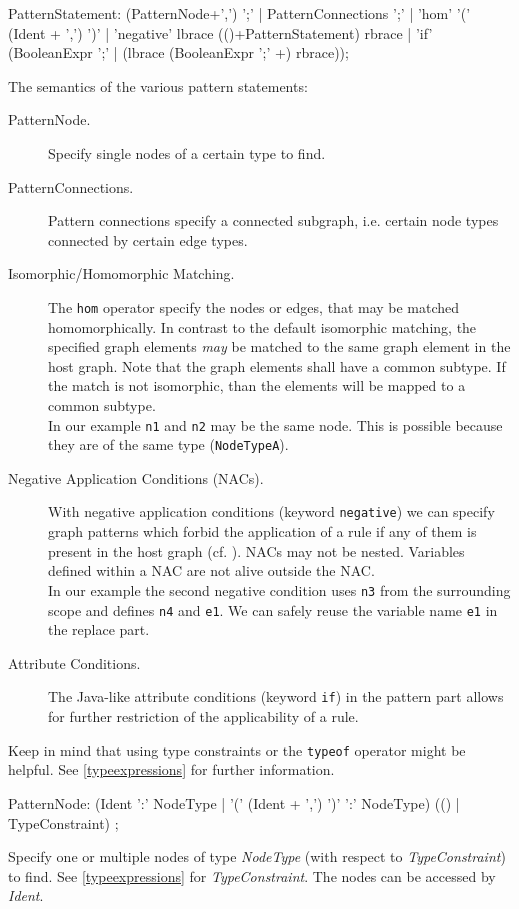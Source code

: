 \begin{rail}  
  PatternStatement: (PatternNode+',') ';' |
    PatternConnections ';' |
    'hom' '(' (Ident + ',') ')' |
    'negative' lbrace (()+PatternStatement) rbrace |
    'if' (BooleanExpr ';' | (lbrace (BooleanExpr ';' +) rbrace));
\end{rail}
The semantics of the various pattern statements:
\begin{description}
  \item[PatternNode.] Specify single nodes of a certain type to find.
  \item[PatternConnections.] Pattern connections specify a connected subgraph, i.e. certain node types connected by certain edge types.
  \item[Isomorphic/Homomorphic Matching.] The \texttt{hom} operator specify the nodes or edges, that may be matched homomorphically. In contrast to the default isomorphic matching, the specified graph elements \emph{may} be matched to the same graph element in the host graph. Note that the graph elements shall have a common subtype. If the match is not isomorphic, than the elements will be mapped to a common subtype.\\
  In our example \texttt{n1} and \texttt{n2} may be the same node. This is possible because they are of the  same type (\texttt{NodeTypeA}).
  \item[Negative Application Conditions (NACs).] With negative application conditions (keyword \texttt{negative}) we can specify graph patterns which forbid the application of a rule if any of them is present in the host graph (cf. \cite{adam}). NACs may not be nested. Variables defined within a NAC are not alive outside the NAC.\\
  In our example the second negative condition uses \texttt{n3} from the surrounding scope and defines \texttt{n4} and \texttt{e1}. We can safely reuse the variable name \texttt{e1} in the replace part.
  \item[Attribute Conditions.] The Java-like attribute conditions (keyword \texttt{if}) in the pattern part allows for further restriction of the applicability of a rule.
\end{description}
Keep in mind that using type constraints or the \texttt{typeof} operator might be helpful. See \ref{typeexpressions} for further information.

\begin{rail}   
  PatternNode: (Ident ':' NodeType 
    | '(' (Ident + ',') ')' ':' NodeType) 
     (() | TypeConstraint) ; 
\end{rail}
Specify one or multiple nodes of type \emph{NodeType} (with respect to \emph{TypeConstraint}) to find. See \ref{typeexpressions} for \emph{TypeConstraint}. The nodes can be accessed by \emph{Ident}.

